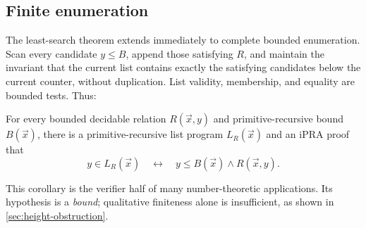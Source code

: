 \subsection{Finite enumeration}

The least-search theorem extends immediately to complete bounded enumeration.  Scan every candidate \(y\leq B\), append those satisfying \(R\), and maintain the invariant that the current list contains exactly the satisfying candidates below the current counter, without duplication.  List validity, membership, and equality are bounded tests.  Thus:

\begin{corollary}\label{cor:bounded-list}
For every bounded decidable relation \(R(\vec x,y)\) and primitive-recursive bound \(B(\vec x)\), there is a primitive-recursive list program \(L_R(\vec x)\) and an iPRA proof that
\[
  y\in L_R(\vec x)
  \quad\leftrightarrow\quad
  y\leq B(\vec x)\wedge R(\vec x,y).
\]
\end{corollary}

This corollary is the verifier half of many number-theoretic applications.  Its hypothesis is a \emph{bound}; qualitative finiteness alone is insufficient, as shown in \cref{sec:height-obstruction}.
